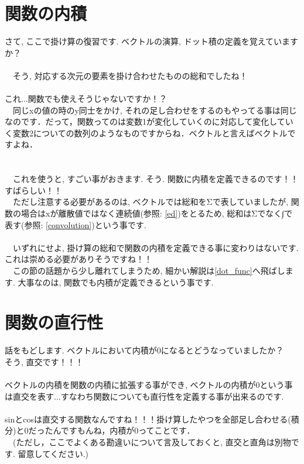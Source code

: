 \documentclass[11pt,a4paper]{ujreport}
\begin{document}
\section{関数の内積　\label{dot}}
さて, ここで掛け算の復習です. ベクトルの演算, ドット積の定義を覚えていますか？\\
\\
　そう, 対応する次元の要素を掛け合わせたものの総和でしたね！\\
\\
これ...関数でも使えそうじゃないですか！？\\
　同じxの値の時のy同士をかけ, それの足し合わせをするのもやってる事は同じなのです．だって，関数ってのは変数1が変化していくのに対応して変化していく変数2についての数列のようなものですからね．ベクトルと言えばベクトルですよね．\\
\\
\\
　これを使うと, すごい事がおきます. そう. 関数に内積を定義できるのです！！すばらしい！！\\
　ただし注意する必要があるのは, ベクトルでは総和をΣで表していましたが, 関数の場合はxが離散値ではなく連続値(参照: \ref{ed})をとるため, 総和はΣでなく∫で表す(参照: \ref{convolution})という事です.\\
\\
　いずれにせよ, 掛け算の総和で関数の内積を定義できる事に変わりはないです. これは崇める必要がありそうですね！！\\
　この節の話題から少し離れてしまうため, 細かい解説は\ref{dot_func}へ飛ばします. 大事なのは, 関数でも内積が定義できるという事です.


\section{関数の直行性}
話をもどします. ベクトルにおいて内積が0になるとどうなっていましたか？\\
そう, 直交です！！！\\
\\
ベクトルの内積を関数の内積に拡張する事ができ, ベクトルの内積が0という事は直交を表す...すなわち関数についても直行性を定義する事が出来るのです.\\
\\
sinとcosは直交する関数なんですね！！！掛け算したやつを全部足し合わせる(積分)と0だったんですもんね，内積が0ってことです．\\
　(ただし，ここでよくある勘違いについて言及しておくと, 直交と直角は別物です. 留意してください.)
\end{document}
